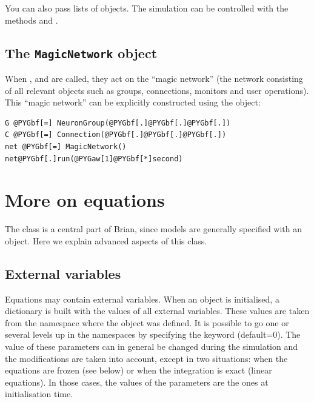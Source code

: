 \documentclass[letterpaper,10pt,english]{manual}
\begin{document}
You can also pass lists of objects. The simulation can be controlled with the methods
 and .


\subsection{The \texttt{MagicNetwork} object}

When \hyperlink{brian.run}{}, \hyperlink{brian.reinit}{} and \hyperlink{brian.stop}{} are called, they act on the ``magic network'' (the network
consisting of all relevant objects such as groups, connections, monitors and user operations). This ``magic
network'' can be explicitly constructed using the \hyperlink{brian.MagicNetwork}{} object:

\begin{Verbatim}[commandchars=@\[\]]
G @PYGbf[=] NeuronGroup(@PYGbf[.]@PYGbf[.]@PYGbf[.])
C @PYGbf[=] Connection(@PYGbf[.]@PYGbf[.]@PYGbf[.])
net @PYGbf[=] MagicNetwork()
net@PYGbf[.]run(@PYGaw[1]@PYGbf[*]second)
\end{Verbatim}

\resetcurrentobjects
\hypertarget{--doc-equations}{}

\hypertarget{moreonequations}{}\section{More on equations}

The \hyperlink{brian.Equations}{} class is a central part of Brian, since
models are generally specified with an \hyperlink{brian.Equations}{} object.
Here we explain advanced aspects of this class.

\hypertarget{index-6}{}\subsection{External variables}

Equations may contain external variables. When an \hyperlink{brian.Equations}{} object is initialised,
a dictionary is built with the values of all external variables. These values are taken
from the namespace where the \hyperlink{brian.Equations}{} object was defined. It is possible to go one or
several levels up in the namespaces by specifying the keyword  (default=0).
The value of these parameters can in general be changed during the simulation and the
modifications are taken into account, except in two situations: when the equations are
frozen (see below) or when the integration is exact (linear equations). In those cases,
the values of the parameters are the ones at initialisation time.
\end{document}

